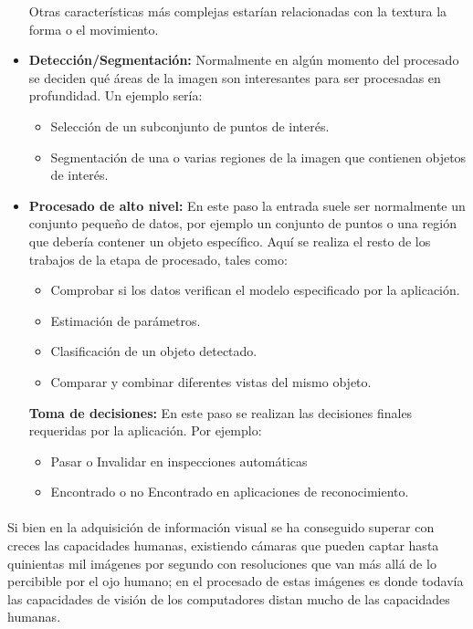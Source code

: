 \documentclass[a4paper,12pt,titlepage,final]{book}
\begin{document}
\begin{itemize}
  Otras características más complejas estarían relacionadas con la textura la
  forma o el movimiento.
  
  \item \textbf{Detección/Segmentación:} Normalmente en algún momento del
  procesado se deciden qué áreas de la imagen son interesantes para ser
  procesadas en profundidad. Un ejemplo sería:
  
  \begin{itemize}
    \item Selección de un subconjunto de puntos de interés.
    \item Segmentación de una o varias regiones de la imagen que contienen objetos
    de interés.
  \end{itemize}
  
  \item \textbf{Procesado de alto nivel:} En este paso la entrada suele ser
  normalmente un conjunto pequeño de datos, por ejemplo un conjunto de puntos o una región que
  debería contener un objeto específico. Aquí se realiza el resto de los trabajos de
  la etapa de procesado, tales como:
  
  \begin{itemize}
    \item Comprobar si los datos verifican el modelo especificado por la aplicación.
    \item Estimación de parámetros.
    \item Clasificación de un objeto detectado.
    \item Comparar y combinar diferentes vistas del mismo objeto.
  \end{itemize}
  
  \textbf{Toma de decisiones:} En este paso se realizan las decisiones finales
  requeridas por la aplicación. Por ejemplo:
  
  \begin{itemize}
    \item Pasar o Invalidar en inspecciones automáticas
    \item Encontrado o no Encontrado en aplicaciones de reconocimiento.
  \end{itemize}
  
\end{itemize}

\paragraph{}
Si bien en la adquisición de información visual se ha conseguido superar con
creces las capacidades humanas, existiendo cámaras que pueden captar hasta
quinientas mil imágenes por segundo con resoluciones que van más allá de lo
percibible por el ojo humano; en el procesado de estas imágenes es donde todavía
las capacidades de visión de los computadores distan mucho de las capacidades
humanas.
\end{document}
